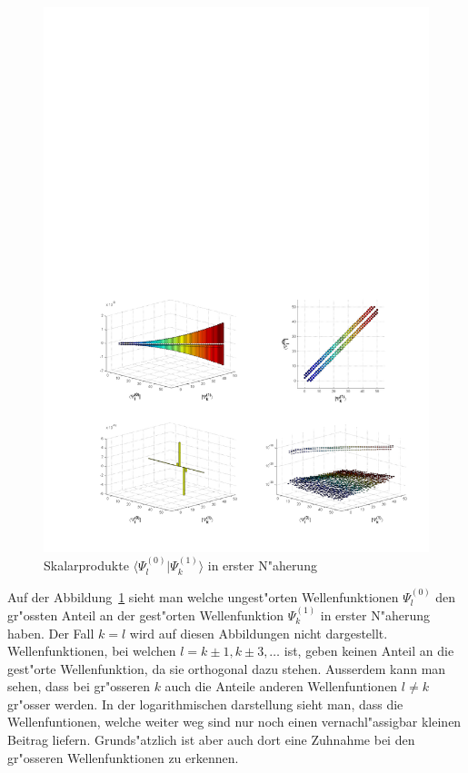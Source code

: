 \begin{refsection}
\begin{figure}[h]	%
\centering
\includegraphics[width=1.0\textwidth]{anharmonisch/images/x4/Stoerung1Skalare.pdf}
\caption{Skalarprodukte $\langle\Psi_l^{(0)}|\Psi_k^{(1)}\rangle$ in erster N"aherung
\label{skript:x4_Stoerung1Skalare}}
\end{figure}

Auf der Abbildung~\ref{skript:x4_Stoerung1Skalare} sieht man welche ungest"orten Wellenfunktionen $\Psi_l^{(0)}$ den gr"ossten Anteil an der gest"orten Wellenfunktion $\Psi_k^{(1)}$ in erster N"aherung haben. Der Fall $k=l$ wird auf diesen Abbildungen nicht dargestellt. Wellenfunktionen, bei welchen $l=k\pm 1,k\pm 3,\dots$ ist, geben keinen Anteil an die gest"orte Wellenfunktion, da sie orthogonal dazu stehen. Ausserdem kann man sehen, dass bei gr"osseren $k$ auch die Anteile anderen Wellenfuntionen $l\neq k$ gr"osser werden. In der logarithmischen darstellung sieht man, dass die Wellenfuntionen, welche weiter weg sind nur noch einen vernachl"assigbar kleinen Beitrag liefern. Grunds"atzlich ist aber auch dort eine Zuhnahme bei den gr"osseren Wellenfunktionen zu erkennen.



\end{refsection}
